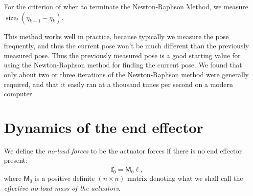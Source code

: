 \documentclass[reqno,12pt]{amsart}
\DeclareMathOperator\size{{size}}
\begin{document}
For the criterion of when to terminate the Newton-Raphson Method, we measure $\size_l(\eta_{k+1} - \eta_k)$.

This method works well in practice, because typically we measure the pose frequently, and thus the current pose won't be much different than the previously measured pose.  Thus the previously measured pose is a good starting value for using the Newton-Raphson method for finding the current pose.  We found that only about two or three iterations of the Newton-Raphson method were generally required, and that it easily ran at a thousand times per second on a modern computer.

\section{Dynamics of the end effector}
\label{dynamics}

We define the \emph{no-load forces} to be the actuator forces if there is no end effector present:
\begin{equation}
\bm f_0 = \mathsf M_0 \ddot{\bm \ell},
\end{equation}
where $\mathsf M_0$ is a positive definite $(n\times n)$ matrix denoting what we shall call the \emph{effective no-load mass of the actuators}.
\end{document}
